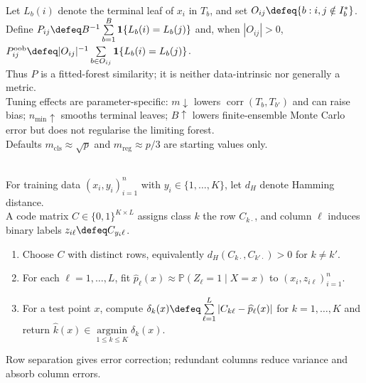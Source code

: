 \begin{remark} \label{rem:sl-random-forest-proximity-overfitting} \\
Let $L_b(i)$ denote the terminal leaf of $x_i$ in $T_b$, and set $O_{ij}\defeq\{b:i,j\notin I_b^*\}$.\\
Define $P_{ij}\defeq B^{-1}\sum\limits_{b=1}^B\mathbf{1}\{L_b(i)=L_b(j)\}$ and, when $|O_{ij}|>0$, $P_{ij}^{\mathrm{oob}}\defeq |O_{ij}|^{-1}\sum\limits_{b\in O_{ij}}\mathbf{1}\{L_b(i)=L_b(j)\}$.\\
Thus $P$ is a fitted-forest similarity; it is neither data-intrinsic nor generally a metric.\\
Tuning effects are parameter-specific: $m\downarrow$ lowers $\operatorname{corr}(T_b,T_{b'})$ and can raise bias; $n_{\min}\uparrow$ smooths terminal leaves; $B\uparrow$ lowers finite-ensemble Monte Carlo error but does not regularise the limiting forest.\\
Defaults $m_{\mathrm{cls}}\approx\sqrt p$ and $m_{\mathrm{reg}}\approx p/3$ are starting values only.
\end{remark}

\begin{method} \label{meth:sl-error-correcting-output-codes} \\
For training data $(x_i,y_i)_{i=1}^n$ with $y_i\in\{1,\ldots,K\}$, let $d_H$ denote Hamming distance.\\
A code matrix $C\in\{0,1\}^{K\times L}$ assigns class $k$ the row $C_{k\cdot}$, and column $\ell$ induces binary labels $z_{i\ell}\defeq C_{y_i\ell}$.
\begin{enumerate}[label=(\roman*)]
\setlength{\itemsep}{0pt}
\item Choose $C$ with distinct rows, equivalently $d_H(C_{k\cdot},C_{k'\cdot})>0$ for $k\neq k'$.
\item For each $\ell=1,\ldots,L$, fit $\widehat{p}_\ell(x)\approx\mathbb{P}(Z_\ell=1\mid X=x)$ to $(x_i,z_{i\ell})_{i=1}^n$.
\item For a test point $x$, compute $\delta_k(x)\defeq\sum\limits_{\ell=1}^L |C_{k\ell}-\widehat{p}_\ell(x)|$ for $k=1,\ldots,K$ and return $\widehat{k}(x)\in\operatorname*{argmin}\limits_{1\leq k\leq K}\delta_k(x)$.
\end{enumerate}
Row separation gives error correction; redundant columns reduce variance and absorb column errors.
\end{method}

